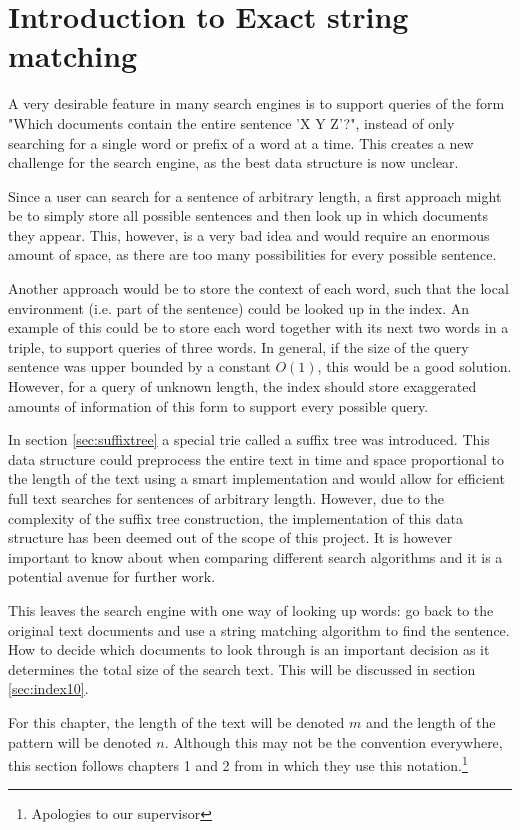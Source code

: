 \section{Introduction to Exact string matching}

A very desirable feature in many search engines is to support queries of the form "Which documents contain the entire sentence 'X Y Z'?", instead of only searching for a single word or prefix of a word at a time. This creates a new challenge for the search engine, as the best data structure is now unclear. 

Since a user can search for a sentence of arbitrary length, a first approach might be to simply store all possible sentences and then look up in which documents they appear. This, however, is a very bad idea and would require an enormous amount of space, as there are too many possibilities for every possible sentence. 

Another approach would be to store the context of each word, such that the local environment (i.e. part of the sentence) could be looked up in the index. An example of this could be to store each word together with its next two words in a triple, to support queries of three words. In general, if the size of the query sentence was upper bounded by a constant $O(1)$, this would be a good solution. However, for a query of unknown length, the index should store exaggerated amounts of information of this form to support every possible query. 

In section \ref{sec:suffixtree} a special trie called a suffix tree was introduced. This data structure could preprocess the entire text in time and space proportional to the length of the text using a smart implementation and would allow for efficient full text searches for sentences of arbitrary length. However, due to the complexity of the suffix tree construction, the implementation of this data structure has been deemed out of the scope of this project. It is however important to know about when comparing different search algorithms and it is a potential avenue for further work. 

This leaves the search engine with one way of looking up words: go back to the original text documents and use a string matching algorithm to find the sentence. How to decide which documents to look through is an important decision as it determines the total size of the search text. This will be discussed in section \ref{sec:index10}. 

For this chapter, the length of the text will be denoted $m$ and the length of the pattern will be denoted $n$. Although this may not be the convention everywhere, this section follows chapters 1 and 2 from \cite{Gusfield1997AlgorithmsOS} in which they use this notation.\footnote{Apologies to our supervisor}

